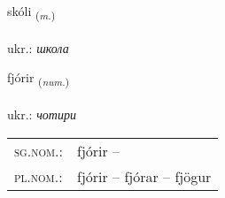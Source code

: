 \documentclass[frontgrid, backgrid]{flacards}\usepackage[]{graphicx}\usepackage[]{xcolor}
\begin{document}
\renewcommand{\flhead}{\vskip5pt \fboxsep=0pt {\small\bfseries\footnotesize Nafnorð | іменник}}
\renewcommand{\fcfoot}{\vskip5pt \fboxsep=0pt \hspace{2pt}{\small\bfseries\footnotesize 1K}}

\renewcommand{\blhead}{\vskip5pt {\small\bfseries\footnotesize Nafnorð | іменник }}
\renewcommand{\bcfoot}{\vskip5pt \hspace{2pt}{\small\bfseries\footnotesize 1K}}


{skóli \small{\textsubscript{(\textit{m.})}} \\[1ex] %
\textphonetic{[skouːlɪ]} \\
ukr.: \emph{школа} \\  [2ex]
\renewcommand*{\arraystretch}{0.8}
}

\renewcommand{\flhead}{\vskip5pt \fboxsep=0pt {\small\bfseries\footnotesize Töluorð | чисельник}}
\renewcommand{\fcfoot}{\vskip5pt \fboxsep=0pt \hspace{2pt}{\small\bfseries\footnotesize 1K}}

\renewcommand{\blhead}{\vskip5pt {\small\bfseries\footnotesize Töluorð | чисельник }}
\renewcommand{\bcfoot}{\vskip5pt \hspace{2pt}{\small\bfseries\footnotesize 1K}}


{fjórir \small{\textsubscript{(\textit{num.})}} \\[1ex] %
\textphonetic{[fjouːrɪr]} \\
ukr.: \emph{чотири} \\  [2ex]
\renewcommand*{\arraystretch}{0.8}
\begin{tabular}{ll}
\textsc{sg.nom.}: & fjórir  -- \\ 
\textsc{pl.nom.}: & fjórir -- fjórar -- fjögur
\end{tabular}
}
\end{document}
